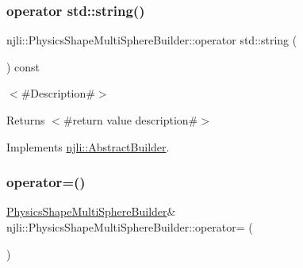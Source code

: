 \subsubsection{\texorpdfstring{operator std\+::string()}{operator std::string()}}
{\footnotesize\ttfamily njli\+::\+Physics\+Shape\+Multi\+Sphere\+Builder\+::operator std\+::string (\begin{DoxyParamCaption}{ }\end{DoxyParamCaption}) const\hspace{0.3cm}{\ttfamily [virtual]}}

$<$\#\+Description\#$>$

\begin{DoxyReturn}{Returns}
$<$\#return value description\#$>$ 
\end{DoxyReturn}


Implements \mbox{\hyperlink{classnjli_1_1_abstract_builder_a3e6e553e06d1ca30517ad5fb0bd4d000}{njli\+::\+Abstract\+Builder}}.

\mbox{\label{classnjli_1_1_physics_shape_multi_sphere_builder_a76d166e48aee7cbfd92c04df9b73dd80}} 
\subsubsection{\texorpdfstring{operator=()}{operator=()}}
{\footnotesize\ttfamily \mbox{\hyperlink{classnjli_1_1_physics_shape_multi_sphere_builder}{Physics\+Shape\+Multi\+Sphere\+Builder}}\& njli\+::\+Physics\+Shape\+Multi\+Sphere\+Builder\+::operator= (\begin{DoxyParamCaption}\item[{const \mbox{\hyperlink{classnjli_1_1_physics_shape_multi_sphere_builder}{Physics\+Shape\+Multi\+Sphere\+Builder}} \&}]{ }\end{DoxyParamCaption})\hspace{0.3cm}{\ttfamily [protected]}}

\mbox{\label{classnjli_1_1_physics_shape_multi_sphere_builder_a862367a2b4f02efb10f9cdcbc5656df8}} 
